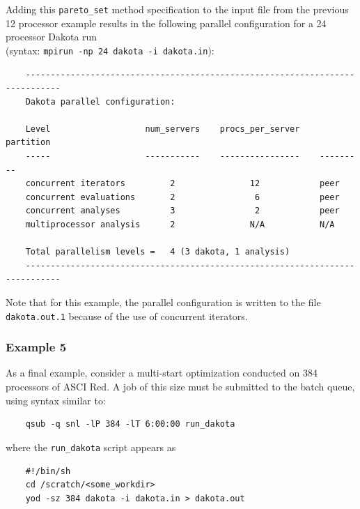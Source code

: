 Adding this \texttt{pareto\_set} method specification to the input file from 
the previous 12 processor example results in the following parallel configuration
for a 24 processor Dakota run \\
(syntax: \texttt{mpirun -np 24 dakota -i dakota.in}):
\begin{small}
\begin{verbatim}
    -----------------------------------------------------------------------------
    Dakota parallel configuration:

    Level                   num_servers    procs_per_server    partition
    -----                   -----------    ----------------    ---------
    concurrent iterators         2               12            peer
    concurrent evaluations       2                6            peer
    concurrent analyses          3                2            peer
    multiprocessor analysis      2               N/A           N/A

    Total parallelism levels =   4 (3 dakota, 1 analysis)
    -----------------------------------------------------------------------------
\end{verbatim}
\end{small}

Note that for this example, the parallel configuration is written to the
file \texttt{dakota.out.1} because of the use of concurrent iterators.

\subsubsection{Example 5}\label{parallel:spec:multi:example5}

As a final example, consider a multi-start optimization conducted on
384 processors of ASCI Red. A job of this size must be submitted to
the batch queue, using syntax similar to:
\begin{small}
\begin{verbatim}
    qsub -q snl -lP 384 -lT 6:00:00 run_dakota
\end{verbatim}
\end{small}

where the \texttt{run\_dakota} script appears as
\begin{small}
\begin{verbatim}
    #!/bin/sh
    cd /scratch/<some_workdir>
    yod -sz 384 dakota -i dakota.in > dakota.out
\end{verbatim}
\end{small}

